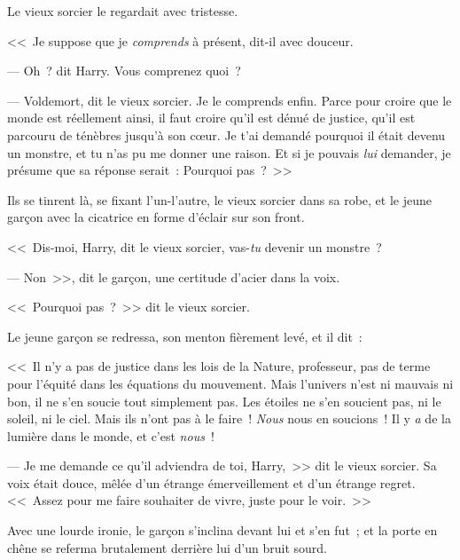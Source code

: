 Le vieux sorcier le regardait avec tristesse.

<<~Je suppose que je \emph{comprends} à présent, dit-il avec douceur.

--- Oh~? dit Harry. Vous comprenez quoi~?

--- Voldemort, dit le vieux sorcier. Je le comprends enfin. Parce pour croire que le monde est réellement ainsi, il faut croire qu'il est dénué de justice, qu'il est parcouru de ténèbres jusqu'à son cœur. Je t'ai demandé pourquoi il était devenu un monstre, et tu n'as pu me donner une raison. Et si je pouvais \emph{lui} demander, je présume que sa réponse serait~: Pourquoi pas~?~>>

\later

Ils se tinrent là, se fixant l'un-l'autre, le vieux sorcier dans sa robe, et le jeune garçon avec la cicatrice en forme d'éclair sur son front.

<<~Dis-moi, Harry, dit le vieux sorcier, vas-\emph{tu} devenir un monstre~?

--- Non~>>, dit le garçon, une certitude d'acier dans la voix.

<<~Pourquoi pas~?~>> dit le vieux sorcier.

Le jeune garçon se redressa, son menton fièrement levé, et il dit~:

<<~Il n'y a pas de justice dans les lois de la Nature, professeur, pas de terme pour l'équité dans les équations du mouvement. Mais l'univers n'est ni mauvais ni bon, il ne s'en soucie tout simplement pas. Les étoiles ne s'en soucient pas, ni le soleil, ni le ciel. Mais ils n'ont pas à le faire~! \emph{Nous} nous en soucions~! Il y \emph{a} de la lumière dans le monde, et c'est \emph{nous}~!

--- Je me demande ce qu'il adviendra de toi, Harry,~>> dit le vieux sorcier. Sa voix était douce, mêlée d'un étrange émerveillement et d'un étrange regret. <<~Assez pour me faire souhaiter de vivre, juste pour le voir.~>>

Avec une lourde ironie, le garçon s'inclina devant lui et s'en fut~; et la porte en chêne se referma brutalement derrière lui d'un bruit sourd.

